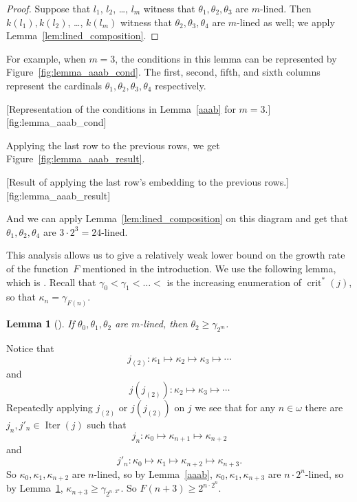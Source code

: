 \documentclass{article}
\newtheorem{lemma}{Lemma}[section]
\theoremstyle{definition}
\theoremstyle{remark}
\DeclareMathOperator{\crit}{crit}
\DeclareMathOperator{\Iter}{Iter}
\begin{document}
\begin{proof}
  Suppose that $l_1$, $l_2$, \dots, $l_m$ witness that $\theta_1,\theta_2,\theta_3$ are $m$-lined. Then $k(l_1), k(l_2)$, \dots, $k(l_m)$  witness that $\theta_2,\theta_3,\theta_4$ are $m$-lined as well; we apply Lemma~\ref{lem:lined_composition}. 
\end{proof}


For example, when $m=3$, the conditions in this lemma can be represented by Figure~\ref{fig:lemma_aaab_cond}. The first, second, fifth, and sixth columns represent the cardinals $\theta_1, \theta_2, \theta_3, \theta_4$ respectively.

[Representation of the conditions in Lemma~\ref{aaab} for $m=3$.][fig:lemma_aaab_cond]

Applying the last row to the previous rows, we get Figure~\ref{fig:lemma_aaab_result}.

[Result of applying the last row's embedding to the previous rows.][fig:lemma_aaab_result]

And we can apply Lemma~\ref{lem:lined_composition} on this diagram and get that $\theta_1, \theta_2, \theta_4$ are $3 \cdot 2^3 = 24$-lined.

\smallskip

This analysis allows us to give a relatively weak lower bound on the growth rate of the function~$F$ mentioned in the introduction. We use the following lemma, which is \cite[Lemma~2]{Dougherty}. Recall that $\gamma_0 < \gamma_1 < \dots < $ is the increasing enumeration of $\crit^*(j)$, so that $\kappa_n = \gamma_{F(n)}$. 

\begin{lemma}[\cite{Dougherty}] \label{lem:doughery_2_n_lemma}
  If $\theta_0,\theta_1,\theta_2$ are $m$-lined, then $\theta_2\ge \gamma_{2^m}$.
\end{lemma}

Notice that 
 \[
 j_{(2)}:\kappa_1\mapsto\kappa_2\mapsto\kappa_3\mapsto \cdots
 \]
 and 
  \[
  j(j_{(2)}):\kappa_2\mapsto\kappa_3\mapsto\cdots 
  \]
 Repeatedly applying $j_{(2)}$ or $j(j_{(2)})$ on $j$ we see that for any $n\in \omega$ there are $j_n,j'_n\in \Iter(j)$ such that 
  \[
  j_n:\kappa_0\mapsto\kappa_{n+1}\mapsto\kappa_{n+2}
  \]
  and
  \[
  j'_n:\kappa_0\mapsto\kappa_1\mapsto\kappa_{n+2}\mapsto\kappa_{n+3}.
  \]
So $\kappa_0,\kappa_1,\kappa_{n+2}$ are $n$-lined, so by Lemma~\ref{aaab}, $\kappa_0,\kappa_1,\kappa_{n+3}$ are $n\cdot 2^n$-lined, so by Lemma~\ref{lem:doughery_2_n_lemma}, $\kappa_{n+3}\ge \gamma_{2^{n\cdot 2^n}}$. So $F(n+3)\ge 2^{n\cdot 2^n}$.
\end{document}
